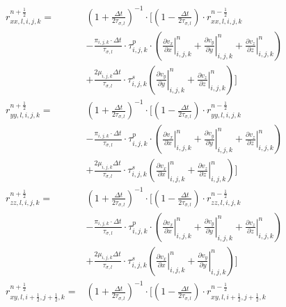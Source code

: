 \documentclass[pdftex,a4paper,parskip,listof=totoc,bibliography=totoc,onehalfspacing,12pt]{scrreprt}
\begin{document}
\begin{align*}
	r_{xx,l,i,j,k}^{n+\frac{1}{2}} =& \left( 1+ \frac{\Delta t}{2\tau_{\sigma,l}} \right)^{-1}\cdot \Bigg[\left( 1- \frac{\Delta t}{2\tau_{\sigma,l}}  \right) \cdot r_{xx,l,i,j,k}^{n-\frac{1}{2}} \\ 
	& -\frac{\pi_{i,j,k}\cdot\Delta t}{\tau_{\sigma,l}}\cdot \tau^p_{i,j,k} \cdot \left( \left.\frac{\partial v_x}{\partial x}\right\rvert_{i,j,k}^{n} + \left.\frac{\partial v_y}{\partial y}\right\rvert_{i,j,k}^{n} + \left.\frac{\partial v_z}{\partial z}\right\rvert_{i,j,k}^{n} \right)\\
	& + \frac{2\mu_{i,j,k} \Delta t}{\tau_{\sigma,l}}\cdot \tau^s_{i,j,k} \left( \left.\frac{\partial v_y}{\partial y}\right\rvert_{i,j,k}^{n} + \left.\frac{\partial v_z}{\partial z}\right\rvert_{i,j,k}^{n}  \right)\Bigg] \\
	r_{yy,l,i,j,k}^{n+\frac{1}{2}} =& \left( 1+ \frac{\Delta t}{2\tau_{\sigma,l}} \right)^{-1}\cdot \Bigg[\left( 1- \frac{\Delta t}{2\tau_{\sigma,l}}  \right) \cdot r_{yy,l,i,j,k}^{n-\frac{1}{2}} \\ 
	& -\frac{\pi_{i,j,k}\cdot\Delta t}{\tau_{\sigma,l}}\cdot \tau^p_{i,j,k} \cdot \left( \left.\frac{\partial v_x}{\partial x}\right\rvert_{i,j,k}^{n} + \left.\frac{\partial v_y}{\partial y}\right\rvert_{i,j,k}^{n} + \left.\frac{\partial v_z}{\partial z}\right\rvert_{i,j,k}^{n} \right)\\
	& + \frac{2\mu_{i,j,k} \Delta t}{\tau_{\sigma,l}}\cdot \tau^s_{i,j,k} \left( \left.\frac{\partial v_x}{\partial x}\right\rvert_{i,j,k}^{n} + \left.\frac{\partial v_z}{\partial z}\right\rvert_{i,j,k}^{n}  \right)\Bigg] \\
	r_{zz,l,i,j,k}^{n+\frac{1}{2}} =& \left( 1+ \frac{\Delta t}{2\tau_{\sigma,l}} \right)^{-1}\cdot \Bigg[\left( 1- \frac{\Delta t}{2\tau_{\sigma,l}}  \right) \cdot r_{zz,l,i,j,k}^{n-\frac{1}{2}} \\ 
	& -\frac{\pi_{i,j,k}\cdot\Delta t}{\tau_{\sigma,l}}\cdot \tau^p_{i,j,k} \cdot \left( \left.\frac{\partial v_x}{\partial x}\right\rvert_{i,j,k}^{n} + \left.\frac{\partial v_y}{\partial y}\right\rvert_{i,j,k}^{n} + \left.\frac{\partial v_z}{\partial z}\right\rvert_{i,j,k}^{n} \right)\\
	& + \frac{2\mu_{i,j,k} \Delta t}{\tau_{\sigma,l}}\cdot \tau^s_{i,j,k} \left( \left.\frac{\partial v_x}{\partial x}\right\rvert_{i,j,k}^{n} + \left.\frac{\partial v_y}{\partial y}\right\rvert_{i,j,k}^{n}  \right)\Bigg] \\
	r_{xy,l,i+\frac{1}{2},j+\frac{1}{2},k}^{n+\frac{1}{2}} =& \left( 1+ \frac{\Delta t}{2\tau_{\sigma,l}} \right)^{-1}\cdot \Bigg[\left( 1- \frac{\Delta t}{2\tau_{\sigma,l}}  \right) \cdot r_{xy,l,i+\frac{1}{2},j+\frac{1}{2},k}^{n-\frac{1}{2}} \\ 

\end{align*}
\end{document}
